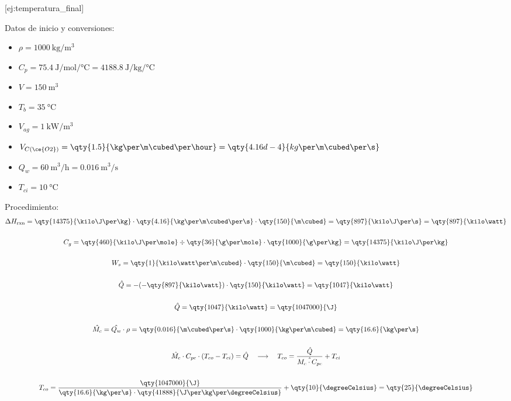 [ej:temperatura_final]{
    Datos de inicio y conversiones:
    \begin{itemize}
        \item $\rho = \qty{1000}{\kg\per\m\cubed}$
        \item $C_{p} = \qty{75.4}{\J\per\mole\per\degreeCelsius} = \qty{4188.8}{\J\per\kg\per\degreeCelsius}$
        \item $V = \qty{150}{\m\cubed}$
        \item $T_{b} = \qty{35}{\degreeCelsius}$
        \item $V_{ag} = \qty{1}{\kilo\watt\per\m\cubed}$
        \item $V_{C(\ce{O2})} = \qty{1.5}{\kg\per\m\cubed\per\hour} = \qty{4.16d-4}{kg\per\m\cubed\per\s}$
        \item $Q_{w} = \qty{60}{\m\cubed\per\hour} = \qty{0.016}{\m\cubed\per\s}$
        \item $T_{ci} = \qty{10}{\degreeCelsius}$
    \end{itemize}
    Procedimiento:
    \begin{gather*}
        \Delta H_{\mathrm{rxn}} = \qty{14375}{\kilo\J\per\kg} \cdot \qty{4.16}{\kg\per\m\cubed\per\s} \cdot \qty{150}{\m\cubed} = \qty{897}{\kilo\J\per\s} = \qty{897}{\kilo\watt}
        \\\\
        C_{g} = \qty{460}{\kilo\J\per\mole} \div \qty{36}{\g\per\mole} \cdot \qty{1000}{\g\per\kg} = \qty{14375}{\kilo\J\per\kg}
        \\\\
        W_{s} = \qty{1}{\kilo\watt\per\m\cubed} \cdot \qty{150}{\m\cubed} = \qty{150}{\kilo\watt}
        \\\\
        \hat{Q} = -(-\qty{897}{\kilo\watt}) \cdot \qty{150}{\kilo\watt} = \qty{1047}{\kilo\watt}
        \\\\
        \hat{Q} = \qty{1047}{\kilo\watt} = \qty{1047000}{\J}
        \\\\
        \hat{M_{c}} = \hat{Q_{w}} \cdot \rho = \qty{0.016}{\m\cubed\per\s} \cdot \qty{1000}{\kg\per\m\cubed} = \qty{16.6}{\kg\per\s} 
        \\\\    
        \hat{M_{c}} \cdot C_{pc} \cdot (T_{co} - T_{ci}) = \hat{Q} \quad\longrightarrow\quad T_{co} = \frac{\hat{Q}}{\hat{M_{c} \cdot C_{pc}}} + T_{ci}
        \\\\
        T_{co} = \frac{\qty{1047000}{\J}}{\qty{16.6}{\kg\per\s} \cdot \qty{4188
        8}{\J\per\kg\per\degreeCelsius}} + \qty{10}{\degreeCelsius} = \qty{25}{\degreeCelsius}
    \end{gather*}
}

